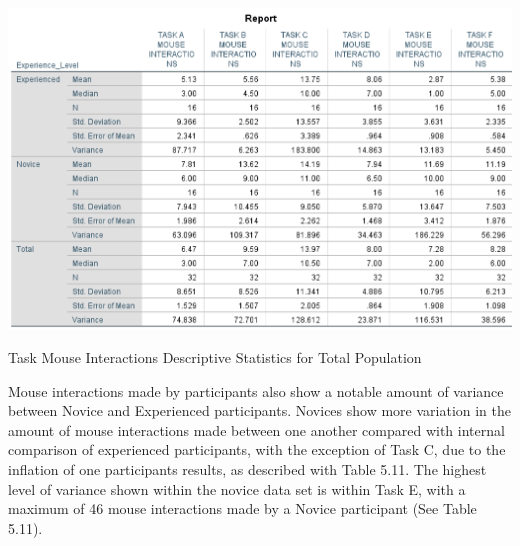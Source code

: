 
\begin{table}[H]
\includegraphics[width=\linewidth]{Screenshots/UXResearchDataFiles/UXTaskMouseInteractionsData/OverallDescriptiveTaskMouseInteractionsEdited.png}
\label{DescriptiveMouseInteractionsTotalPopulation}
\caption{Task Mouse Interactions Descriptive Statistics for Total Population}
\end{table}

Mouse interactions made by participants also show a notable amount of variance between Novice and Experienced participants. Novices show more variation in the amount of mouse interactions made between one another compared with internal comparison of experienced participants, with the exception of Task C, due to the inflation of one participants results, as described with Table 5.11. The highest level of variance shown within the novice data set is within Task E, with a maximum of 46 mouse interactions made by a Novice participant (See Table 5.11).

